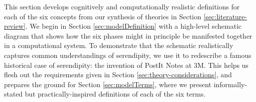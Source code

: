 This section develops cognitively and computationally realistic
definitions for each of the six concepts from our synthesis of
theories in Section \ref{sec:literature-review}. 
We begin in Section \ref{sec:modelDefinition} with a high-level schematic diagram
that shows how the six phases might in principle be manifested
together in a computational system.  To demonstrate that the schematic
realistically captures common understandings of serendipity, we use it
to redescribe a famous historical case of serendipity: the invention
of PostIt\textsuperscript{\textregistered} Notes at 3M. This helps us
flesh out the requirements given in Section
\ref{sec:theory-considerations}, and prepares the ground for
Section \ref{sec:modelTerms}, where we present
informally-stated but practically-inspired definitions of each of the six terms.

